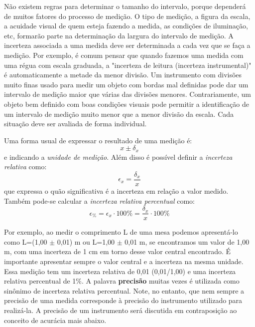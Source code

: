 Não existem regras para determinar o tamanho do intervalo, porque dependerá de muitos fatores do processo de medição. O tipo de medição, a figura da escala, a acuidade visual de quem esteja fazendo a medida, as condições de iluminação, etc, formarão parte na determinação da largura do intervalo de medição. A incerteza associada a uma medida deve ser determinada a cada vez que se faça a medição. Por exemplo, é comum pensar que quando fazemos uma medida com uma régua com escala graduada, a "incerteza de leitura (incerteza instrumental)" é automaticamente a metade da menor divisão. Um instrumento com divisões muito finas usado para medir um objeto com bordas mal definidas pode dar um intervalo de medição maior que várias das divisões menores. Contrariamente, um objeto bem definido com boas condições visuais pode permitir a identificação de um intervalo de medição muito menor que a menor divisão da escala. Cada situação deve ser avaliada de forma individual.
 
\vspace{-0.2 cm}
Uma forma usual de expressar o resultado de uma medição é:         
\begin{equation}
x \pm \delta_{x} 
\end{equation}
\noindent
e indicando a {\it unidade de medição}. Além disso é possível definir a {\it incerteza relativa} como:
\begin{equation}
\epsilon_x = \frac{\delta_x}{x} 
\end{equation}
\noindent
que expressa o quão significativa é a incerteza em relação a valor medido. Também pode-se calcular a {\it incerteza relativa percentual} como:
\begin{equation}
\epsilon_{\%} = \epsilon_x \cdot 100\% = \frac{\delta_x}{x} \cdot 100\% 
\end{equation}
\noindent

Por exemplo, ao medir o comprimento L de uma mesa podemos apresentá-lo como L=(1,00 $\pm$ 0,01) m ou L=1,00 $\pm$ 0,01 m, se encontramos um valor de 1,00 m, com uma incerteza de 1 cm em torno desse valor central encontrado. É importante apresentar sempre o valor central e a incerteza na mesma unidade. Essa medição tem um incerteza relativa de 0,01 (0,01/1,00) e uma incerteza relativa percentual de 1\%. A palavra {\bf precisão} muitas vezes é utilizada como sinônimo de incerteza relativa percentual. Note, no entanto, que nem sempre a precisão de uma medida corresponde à precisão do instrumento utilizado para realizá-la. A precisão de um instrumento será discutida em contraposição ao conceito de acurácia mais abaixo.
\newpage
